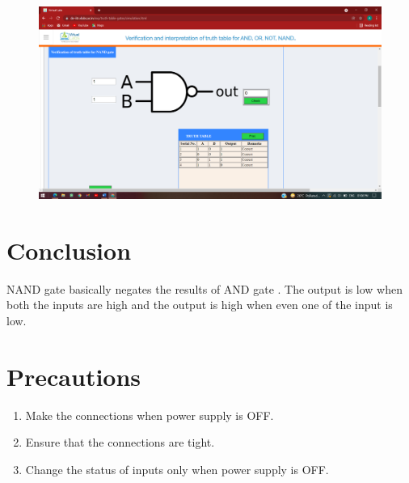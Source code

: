 		\begin{figure}[h]
		\centering
		\includegraphics[width=0.9\linewidth]{img/exp4/7}
		\caption{}
		\label{fig:4:7}
	\end{figure}

\section{Conclusion}
NAND gate basically negates the results of AND gate . The output is low when both the inputs are high and the output is high when even one of the input is low.

\section{Precautions}
	\begin{enumerate}
		\tightlist
		\item Make the connections when power supply is OFF.
		\item Ensure that the connections are tight.
		\item Change the status of inputs only when power supply is OFF.
	\end{enumerate}